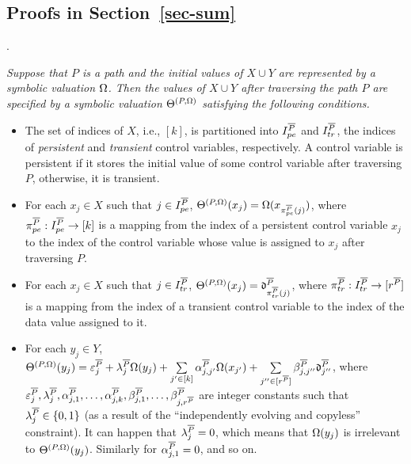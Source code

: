 \begin{appendix}
\section{Proofs in Section~\ref{sec-sum}}


.
{
\it Suppose that $P$ is a path and the initial values of $X \cup Y$ are represented by a symbolic valuation $\Omega$. Then the values of $X \cup Y$ after traversing the path $P$ are specified by a symbolic valuation $\Theta^{(P,\Omega)}$ satisfying the following conditions.
\begin{itemize}
\item The set of indices of $X$, i.e., $[k]$, is partitioned into $I^{\overline{P}}_{pe}$ and $I^{\overline{P}}_{tr}$, the indices of \emph{persistent} and \emph{transient} control variables, respectively. A control variable is persistent if it stores the initial value of some control variable after traversing $P$, otherwise, it is transient.
\item For each $x_j\in X$ such that $j\in I^{\overline{P}}_{pe}$, $\Theta^{(P,\Omega)}(x_j)=\Omega(x_{\pi^{\overline{P}}_{pe}(j)})$, where $\pi^{\overline{P}}_{pe}: I^{\overline{P}}_{pe} \rightarrow [k]$ is a mapping from the index of a persistent control variable $x_j$ to the index of the control variable whose value is assigned to $x_j$ after traversing $P$.
%
\item  For each $x_j\in X$ such that $j\in I^{\overline{P}}_{tr}$,
$\Theta^{(P,\Omega)}(x_j)=\mathfrak{d}^{\overline{P}}_{\pi^{\overline{P}}_{tr}(j)}$, where $\pi^{\overline{P}}_{tr}: I^{\overline{P}}_{tr} \rightarrow [r^{\overline{P}}]$ is a mapping from the index of a transient control variable to the index of the data value assigned to it.
% 
\item For each $y_j \in Y$, 
$
 \Theta^{(P,\Omega)}(y_j)  =
 \varepsilon^{\overline{P}}_{j} + 
 \lambda^{\overline{P}}_j \Omega(y_j)  + 
  \sum\limits_{j'\in [k]}\alpha^{\overline{P}}_{j,j'}\Omega(x_{j'}) +
  \sum\limits_{j''\in [r^{\overline{P}}]}\beta^{\overline{P}}_{j,j''} \mathfrak{d}^{\overline{P}}_{j''}$,
where $\varepsilon^{\overline{P}}_j,\lambda^{\overline{P}}_j, \alpha^{\overline{P}}_{j,1},\dots,\alpha^{\overline{P}}_{j,k}, \beta^{\overline{P}}_{j,1},\dots,\beta^{\overline{P}}_{j,r^{\overline{P}}}$ are integer constants such that $\lambda^{\overline{P}}_{j} \in \{0,1\}$ (as a result of the ``independently evolving and copyless'' constraint).  It can happen that $\lambda^{\overline{P}}_j =0$,  which means that $\Omega(y_j)$ is irrelevant to $\Theta^{(P,\Omega)}(y_j)$. Similarly for $\alpha^{\overline{P}}_{j,1}=0$, and so on.
\end{itemize}
}


\end{appendix}
